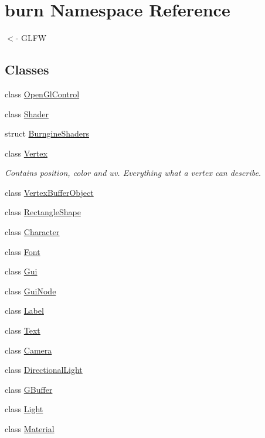 \hypertarget{namespaceburn}{\section{burn Namespace Reference}
\label{namespaceburn}
}


$<$-\/ G\-L\-F\-W  


\subsection*{Classes}
\begin{DoxyCompactItemize}
\item 
class \hyperlink{classburn_1_1_open_gl_control}{Open\-Gl\-Control}
\item 
class \hyperlink{classburn_1_1_shader}{Shader}
\item 
struct \hyperlink{structburn_1_1_burngine_shaders}{Burngine\-Shaders}
\item 
class \hyperlink{classburn_1_1_vertex}{Vertex}
\begin{DoxyCompactList}\small\item\em Contains position, color and uv. Everything what a vertex can describe. \end{DoxyCompactList}\item 
class \hyperlink{classburn_1_1_vertex_buffer_object}{Vertex\-Buffer\-Object}
\item 
class \hyperlink{classburn_1_1_rectangle_shape}{Rectangle\-Shape}
\item 
class \hyperlink{classburn_1_1_character}{Character}
\item 
class \hyperlink{classburn_1_1_font}{Font}
\item 
class \hyperlink{classburn_1_1_gui}{Gui}
\item 
class \hyperlink{classburn_1_1_gui_node}{Gui\-Node}
\item 
class \hyperlink{classburn_1_1_label}{Label}
\item 
class \hyperlink{classburn_1_1_text}{Text}
\item 
class \hyperlink{classburn_1_1_camera}{Camera}
\item 
class \hyperlink{classburn_1_1_directional_light}{Directional\-Light}
\item 
class \hyperlink{classburn_1_1_g_buffer}{G\-Buffer}
\item 
class \hyperlink{classburn_1_1_light}{Light}
\item 
class \hyperlink{classburn_1_1_material}{Material}
\item 

\end{DoxyCompactItemize}
